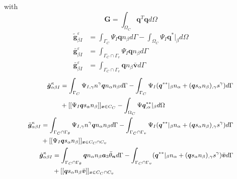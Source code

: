 with
\begin{equation}
\boldsymbol G = \int_{\Omega_C} \boldsymbol q^T \boldsymbol q d\Omega
\end{equation}
\begin{subequations}
\begin{align}
\tilde{\boldsymbol g}^\varepsilon_{\beta I} &= \int_{\Gamma_C} \Psi_I \boldsymbol q n_\beta d\Gamma
- \int_{\Omega_C} \Psi_I \boldsymbol q^*\vert_\beta d\Omega \\
\bar{\boldsymbol g}^\varepsilon_{\beta I} &= \int_{\Gamma_C\cap\Gamma_v} \Psi_I \boldsymbol q n_\beta d\Gamma \\
\bar{\boldsymbol g}^\varepsilon_{\beta I} &= \int_{\Gamma_C\cap\Gamma_v} \boldsymbol q n_\beta \bar{\boldsymbol v} d\Gamma 
\end{align}
\end{subequations}
\begin{subequations}
\begin{align}
\small
\begin{split}
\tilde{\boldsymbol g}^\kappa_{\alpha\beta I} &= \int_{\Gamma_C} \Psi_{I,\gamma}n^\gamma \boldsymbol q n_\alpha n_\beta d\Gamma 
- \int_{\Gamma_C} \Psi_I(\boldsymbol q^{**}\vert_\beta n_\alpha + (\boldsymbol q s_\alpha n_\beta)_{,\gamma}s^\gamma) d\Gamma \\
&+ [[\Psi_I \boldsymbol q s_\alpha n_\beta]]_{\boldsymbol x\in C_C}
- \int_{\Omega_C} \Psi \boldsymbol q^{**}_{,\alpha}\vert_\beta d\Omega \\
\end{split} \\
\small
\begin{split}
\bar{\boldsymbol g}^\kappa_{\alpha\beta I} &= \int_{\Gamma_C\cap\Gamma_\theta} \Psi_{I,\gamma}n^\gamma \boldsymbol q n_\alpha n_\beta d\Gamma 
- \int_{\Gamma_C\cap\Gamma_v} \Psi_I(\boldsymbol q^{**}\vert_\beta n_\alpha + (\boldsymbol q s_\alpha n_\beta)_{,\gamma}s^\gamma) d\Gamma \\
&+ [[\Psi_I \boldsymbol q s_\alpha n_\beta]]_{\boldsymbol x\in C_C\cap C_v}
\end{split} \\
\small
\begin{split}
\hat{\boldsymbol g}^\kappa_{\alpha\beta I} &= \int_{\Gamma_C\cap\Gamma_\theta} \boldsymbol q n_\alpha n_\beta \boldsymbol a_3 \bar{\theta}_{\boldsymbol n} d\Gamma 
- \int_{\Gamma_C\cap\Gamma_v}(\boldsymbol q^{**}\vert_\beta n_\alpha + (\boldsymbol q s_\alpha n_\beta)_{,\gamma}s^\gamma)\bar{\boldsymbol v} d\Gamma \\
&+ [[\boldsymbol q s_\alpha n_\beta \bar{\boldsymbol v}]]_{\boldsymbol x\in C_C\cap C_v}
\end{split}
\end{align}
\end{subequations}
